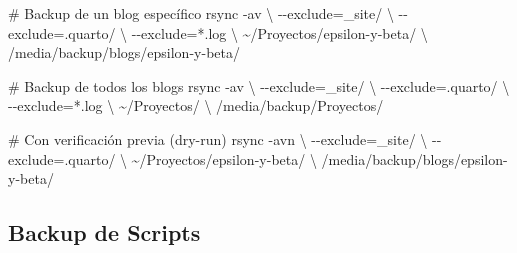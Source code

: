 \documentclass[
  doc,
  floatsintext,
  longtable,
  a4paper,
  nolmodern,
  notxfonts,
  notimes,
  12pt,
  colorlinks=true,linkcolor=blue,citecolor=blue,urlcolor=blue]{apa7}
\newenvironment{Shaded}{\begin{snugshade}}{\end{snugshade}}
\newcommand{\AttributeTok}[1]{\textcolor[rgb]{0.40,0.45,0.13}{#1}}
\newcommand{\CommentTok}[1]{\textcolor[rgb]{0.37,0.37,0.37}{#1}}
\newcommand{\DataTypeTok}[1]{\textcolor[rgb]{0.68,0.00,0.00}{#1}}
\newcommand{\FunctionTok}[1]{\textcolor[rgb]{0.28,0.35,0.67}{#1}}
\newcommand{\NormalTok}[1]{\textcolor[rgb]{0.00,0.23,0.31}{#1}}
\newcommand{\OperatorTok}[1]{\textcolor[rgb]{0.37,0.37,0.37}{#1}}
\newcommand{\StringTok}[1]{\textcolor[rgb]{0.13,0.47,0.30}{#1}}
\begin{document}
\begin{Shaded}
\begin{Highlighting}[]
\CommentTok{\# Backup de un blog específico}
\FunctionTok{rsync} \AttributeTok{{-}av} \DataTypeTok{\textbackslash{}}
  \AttributeTok{{-}{-}exclude}\OperatorTok{=}\StringTok{\textquotesingle{}\_site/\textquotesingle{}} \DataTypeTok{\textbackslash{}}
  \AttributeTok{{-}{-}exclude}\OperatorTok{=}\StringTok{\textquotesingle{}.quarto/\textquotesingle{}} \DataTypeTok{\textbackslash{}}
  \AttributeTok{{-}{-}exclude}\OperatorTok{=}\StringTok{\textquotesingle{}*.log\textquotesingle{}} \DataTypeTok{\textbackslash{}}
\NormalTok{  \textasciitilde{}/Proyectos/epsilon{-}y{-}beta/ }\DataTypeTok{\textbackslash{}}
\NormalTok{  /media/backup/blogs/epsilon{-}y{-}beta/}

\CommentTok{\# Backup de todos los blogs}
\FunctionTok{rsync} \AttributeTok{{-}av} \DataTypeTok{\textbackslash{}}
  \AttributeTok{{-}{-}exclude}\OperatorTok{=}\StringTok{\textquotesingle{}\_site/\textquotesingle{}} \DataTypeTok{\textbackslash{}}
  \AttributeTok{{-}{-}exclude}\OperatorTok{=}\StringTok{\textquotesingle{}.quarto/\textquotesingle{}} \DataTypeTok{\textbackslash{}}
  \AttributeTok{{-}{-}exclude}\OperatorTok{=}\StringTok{\textquotesingle{}*.log\textquotesingle{}} \DataTypeTok{\textbackslash{}}
\NormalTok{  \textasciitilde{}/Proyectos/ }\DataTypeTok{\textbackslash{}}
\NormalTok{  /media/backup/Proyectos/}

\CommentTok{\# Con verificación previa (dry{-}run)}
\FunctionTok{rsync} \AttributeTok{{-}avn} \DataTypeTok{\textbackslash{}}
  \AttributeTok{{-}{-}exclude}\OperatorTok{=}\StringTok{\textquotesingle{}\_site/\textquotesingle{}} \DataTypeTok{\textbackslash{}}
  \AttributeTok{{-}{-}exclude}\OperatorTok{=}\StringTok{\textquotesingle{}.quarto/\textquotesingle{}} \DataTypeTok{\textbackslash{}}
\NormalTok{  \textasciitilde{}/Proyectos/epsilon{-}y{-}beta/ }\DataTypeTok{\textbackslash{}}
\NormalTok{  /media/backup/blogs/epsilon{-}y{-}beta/}
\end{Highlighting}
\end{Shaded}

\subsection{Backup de Scripts}\label{backup-de-scripts}
\end{document}

